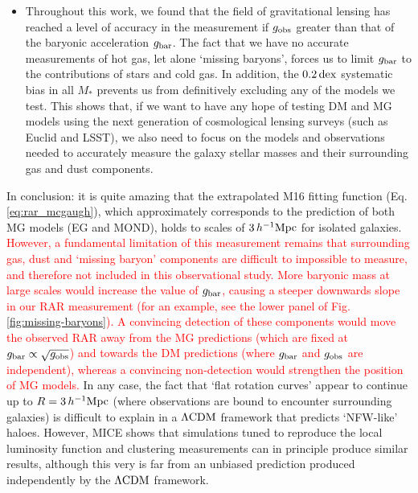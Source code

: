 \documentclass[usenatbib]{mnras}
\newcommand{\hMpc}{\, h^{-1}{\rm{Mpc}} }
\newcommand{\lcdm}{{\rm \Lambda CDM}}
\newcommand{\un}[1]{_{\rm #1}}
\newcommand{\dex}{\, {\rm dex}}
\begin{document}
\begin{itemize}
	\item Throughout this work, we found that the field of gravitational lensing has reached a level of accuracy in the measurement if $g\un{obs}$ greater than that of the baryonic acceleration $g\un{bar}$. The fact that we have no accurate measurements of hot gas, let alone `missing baryons', forces us to limit $g\un{bar}$ to the contributions of stars and cold gas. In addition, the $0.2 \dex$ systematic bias in all $M_*$ prevents us from definitively excluding any of the models we test. This shows that, if we want to have any hope of testing DM and MG models using the next generation of cosmological lensing surveys (such as Euclid and LSST), we also need to focus on the models and observations needed to accurately measure the galaxy stellar masses and their surrounding gas and dust components.
	
\end{itemize}

In conclusion: it is quite amazing that the extrapolated M16 fitting function (Eq. \ref{eq:rar_mcgaugh}), which approximately corresponds to the prediction of both MG models (EG and MOND), holds to scales of $3 \hMpc$ for isolated galaxies. \textcolor{red}{However, a fundamental limitation of this measurement remains that surrounding gas, dust and `missing baryon' components are difficult to impossible to measure, and therefore not included in this observational study. More baryonic mass at large scales would increase the value of $g\un{bar}$, causing a steeper downwards slope in our RAR measurement (for an example, see the lower panel of Fig. \ref{fig:missing-baryons}). A convincing detection of these components would move the observed RAR away from the MG predictions (which are fixed at $g\un{bar} \propto \sqrt{g\un{obs}}$) and towards the DM predictions (where $g\un{bar}$ and $g\un{obs}$ are independent), whereas a convincing non-detection would strengthen the position of MG models.} In any case, the fact that `flat rotation curves' appear to continue up to $R=3\hMpc$ (where observations are bound to encounter surrounding galaxies) is difficult to explain in a $\lcdm$ framework that predicts `NFW-like' haloes. However, MICE shows that simulations tuned to reproduce the local luminosity function and clustering measurements can in principle produce similar results, although this very is far from an unbiased prediction produced independently by the $\lcdm$ framework.
\end{document}
